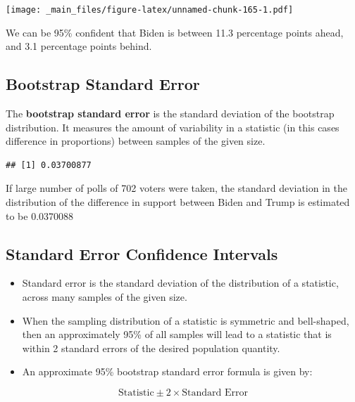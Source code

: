 \documentclass[]{book}
\newenvironment{Shaded}{\begin{snugshade}}{\end{snugshade}}
\newcommand{\KeywordTok}[1]{\textcolor[rgb]{0.13,0.29,0.53}{\textbf{#1}}}
\newcommand{\OperatorTok}[1]{\textcolor[rgb]{0.81,0.36,0.00}{\textbf{#1}}}
\newcommand{\NormalTok}[1]{#1}
\begin{document}
\texttt{[image: \_main\_files/figure-latex/unnamed-chunk-165-1.pdf]}

We can be 95\% confident that Biden is between 11.3 percentage points
ahead, and 3.1 percentage points behind.

\subsection{Bootstrap Standard Error}\label{bootstrap-standard-error}

The \textbf{bootstrap standard error} is the standard deviation of the
bootstrap distribution. It measures the amount of variability in a
statistic (in this cases difference in proportions) between samples of
the given size.

\begin{Shaded}
\end{Shaded}

\begin{verbatim}
## [1] 0.03700877
\end{verbatim}

If large number of polls of 702 voters were taken, the standard
deviation in the distribution of the difference in support between Biden
and Trump is estimated to be 0.0370088

\subsection{Standard Error Confidence
Intervals}\label{standard-error-confidence-intervals}

\begin{itemize}
\item
  Standard error is the standard deviation of the distribution of a
  statistic, across many samples of the given size.
\item
  When the sampling distribution of a statistic is symmetric and
  bell-shaped, then an approximately 95\% of all samples will lead to a
  statistic that is within 2 standard errors of the desired population
  quantity.
\item
  An approximate 95\% bootstrap standard error formula is given by:
\end{itemize}

\[
\text{Statistic} \pm 2\times\text{Standard Error}
\]
\end{document}

